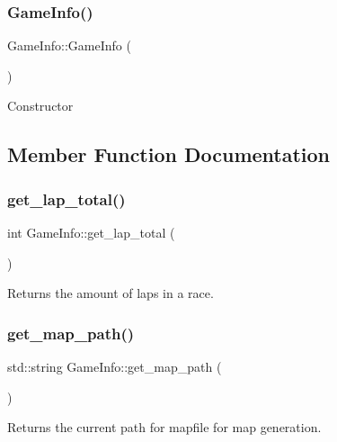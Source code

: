 \subsubsection{\texorpdfstring{Game\+Info()}{GameInfo()}}
{\footnotesize\ttfamily Game\+Info\+::\+Game\+Info (\begin{DoxyParamCaption}{ }\end{DoxyParamCaption})\hspace{0.3cm}{\ttfamily [inline]}}

Constructor 

\subsection{Member Function Documentation}
\hypertarget{classGameInfo_ab8f5a3a0d1aa460ed0956f211bbc445c}{}\label{classGameInfo_ab8f5a3a0d1aa460ed0956f211bbc445c} 
\subsubsection{\texorpdfstring{get\+\_\+lap\+\_\+total()}{get\_lap\_total()}}
{\footnotesize\ttfamily int Game\+Info\+::get\+\_\+lap\+\_\+total (\begin{DoxyParamCaption}{ }\end{DoxyParamCaption})\hspace{0.3cm}{\ttfamily [inline]}}

Returns the amount of laps in a race. \hypertarget{classGameInfo_aa9c66670430c8ce52125cea87b6c38a5}{}\label{classGameInfo_aa9c66670430c8ce52125cea87b6c38a5} 
\subsubsection{\texorpdfstring{get\+\_\+map\+\_\+path()}{get\_map\_path()}}
{\footnotesize\ttfamily std\+::string Game\+Info\+::get\+\_\+map\+\_\+path (\begin{DoxyParamCaption}{ }\end{DoxyParamCaption})\hspace{0.3cm}{\ttfamily [inline]}}

Returns the current path for mapfile for map generation. \hypertarget{classGameInfo_a4a3618e3691078217e3bec548bcf40cc}{}\label{classGameInfo_a4a3618e3691078217e3bec548bcf40cc} 
